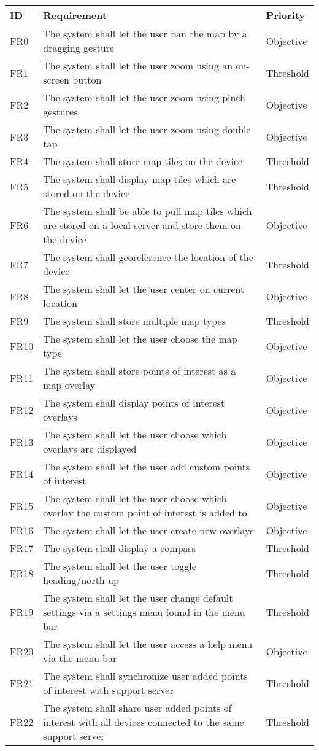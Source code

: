 \documentclass{article}
\begin{document}
\begin{tabular}{ | p{.5in} | p{4.5in} | p{1in}|}
\hline
\textbf{ID} & \textbf{Requirement} & \textbf{Priority}\\
\hline
\hline
FR0 & The system shall let the user pan the map by a dragging gesture & Objective\\
\hline
FR1 & The system shall let the user zoom using an on-screen button & Threshold\\
\hline
FR2 & The system shall let the user zoom using pinch gestures & Objective\\
\hline
FR3 & The system shall let the user zoom using double tap & Objective\\
\hline
FR4 & The system shall store map tiles on the device & Threshold\\
\hline
FR5 & The system shall display map tiles which are stored on the device & Threshold\\
\hline
FR6 & The system shall be able to pull map tiles which are stored on a local server and store them on the device & Objective\\
\hline
FR7 & The system shall georeference the location of the device & Threshold\\
\hline
FR8 & The system shall let the user center on current location & Objective\\
\hline
FR9 & The system shall store multiple map types & Threshold\\
\hline
FR10 & The system shall let the user choose the map type & Objective\\
\hline
FR11 & The system shall store points of interest as a map overlay & Objective\\
\hline
FR12 & The system shall display points of interest overlays & Objective\\
\hline
FR13 & The system shall let the user choose which overlays are displayed & Objective\\
\hline
FR14 & The system shall let the user add custom points of interest & Objective\\
\hline
FR15 & The system shall let the user choose which overlay the custom point of interest is added to & Objective\\
\hline
FR16 & The system shall let the user create new overlays & Objective\\
\hline
FR17 & The system shall display a compass & Threshold\\
\hline
FR18 & The system shall let the user toggle heading/north up & Threshold\\
\hline
FR19 & The system shall let the user change default settings via a settings menu found in the menu bar & Threshold\\
\hline
FR20 & The system shall let the user access a help menu via the menu bar & Objective\\
\hline
FR21 & The system shall synchronize user added points of interest with support server & Threshold\\
\hline
FR22 & The system shall share user added points of interest with all devices connected to the same support server & Threshold\\
\hline
\end{tabular}
\end{document}
